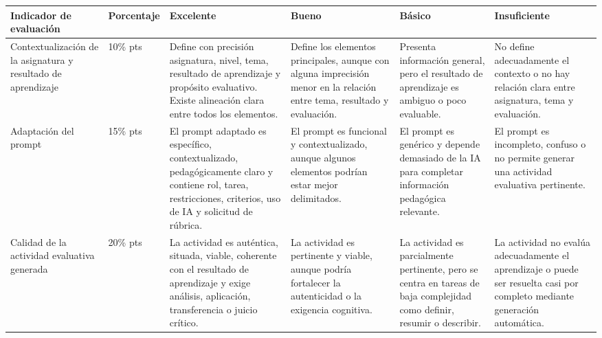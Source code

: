 \documentclass[12pt,letterpaper]{article}
\begin{document}
\begin{landscape}
  \tiny
  \begin{longtable}{p{3.1cm} p{2cm} p{3.1cm} p{3.1cm} p{3.1cm} p{3.1cm}}
    \toprule
    \textbf{Indicador de evaluación} & \textbf{Porcentaje} &
    \textbf{Excelente} & \textbf{Bueno} & \textbf{Básico} &
    \textbf{Insuficiente} \\
    \midrule
    \endhead

    Contextualización de la asignatura y resultado de aprendizaje
    & 10\% \newline 10 pts
    & Define con precisión asignatura, nivel, tema, resultado de
    aprendizaje y propósito evaluativo. Existe alineación clara entre
    todos los elementos.
    & Define los elementos principales, aunque con alguna imprecisión
    menor en la relación entre tema, resultado y evaluación.
    & Presenta información general, pero el resultado de aprendizaje es
    ambiguo o poco evaluable.
    & No define adecuadamente el contexto o no hay relación clara entre
    asignatura, tema y evaluación. \\

    \addlinespace

    Adaptación del prompt
    & 15\% \newline 15 pts
    & El prompt adaptado es específico, contextualizado,
    pedagógicamente claro y contiene rol, tarea, restricciones,
    criterios, uso de IA y solicitud de rúbrica.
    & El prompt es funcional y contextualizado, aunque algunos
    elementos podrían estar mejor delimitados.
    & El prompt es genérico y depende demasiado de la IA para completar
    información pedagógica relevante.
    & El prompt es incompleto, confuso o no permite generar una
    actividad evaluativa pertinente. \\

    \addlinespace

    Calidad de la actividad evaluativa generada
    & 20\% \newline 20 pts
    & La actividad es auténtica, situada, viable, coherente con el
    resultado de aprendizaje y exige análisis, aplicación,
    transferencia o juicio crítico.
    & La actividad es pertinente y viable, aunque podría fortalecer la
    autenticidad o la exigencia cognitiva.
    & La actividad es parcialmente pertinente, pero se centra en tareas
    de baja complejidad como definir, resumir o describir.
    & La actividad no evalúa adecuadamente el aprendizaje o puede ser
    resuelta casi por completo mediante generación automática. \\


\end{longtable}
\end{landscape}
\end{document}

